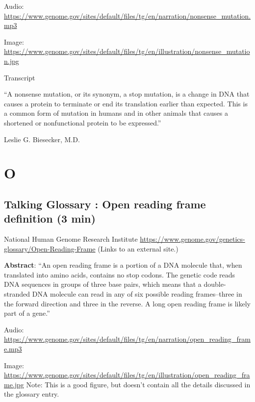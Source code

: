 \documentclass[
]{book}
\begin{document}
Audio: \url{https://www.genome.gov/sites/default/files/tg/en/narration/nonsense_mutation.mp3}

Image: \url{https://www.genome.gov/sites/default/files/tg/en/illustration/nonsense_mutation.jpg}

Transcript

``A nonsense mutation, or its synonym, a stop mutation, is a change in DNA that causes a protein to terminate or end its translation earlier than expected. This is a common form of mutation in humans and in other animals that causes a shortened or nonfunctional protein to be expressed.''

Leslie G. Biesecker, M.D.

\hypertarget{o}{%
\chapter{O}\label{o}}

\hypertarget{talking-glossary-open-reading-frame-definition-3-min}{%
\section{Talking Glossary : Open reading frame definition (3 min)}\label{talking-glossary-open-reading-frame-definition-3-min}}

National Human Genome Research Institute
\url{https://www.genome.gov/genetics-glossary/Open-Reading-Frame} (Links to an external site.)

\textbf{Abstract}: ``An open reading frame is a portion of a DNA molecule that, when translated into amino acids, contains no stop codons. The genetic code reads DNA sequences in groups of three base pairs, which means that a double-stranded DNA molecule can read in any of six possible reading frames--three in the forward direction and three in the reverse. A long open reading frame is likely part of a gene.''

Audio: \url{https://www.genome.gov/sites/default/files/tg/en/narration/open_reading_frame.mp3}

Image: \url{https://www.genome.gov/sites/default/files/tg/en/illustration/open_reading_frame.jpg}
Note: This is a good figure, but doesn't contain all the details discussed in the glossary entry.
\end{document}
